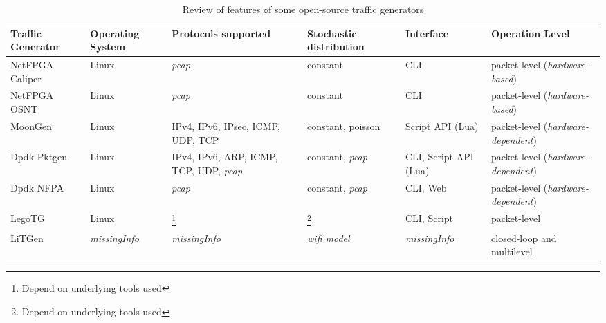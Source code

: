 \begin{table}[t!]
\caption{Review of features of some open-source traffic generators}
\begin{center}
\begin{footnotesize}
\begin{tabularx}{\linewidth}{
|>{\hsize=0.9\hsize\raggedright\arraybackslash}X	%
|>{\hsize=1.16\hsize\centering\arraybackslash}X					%
>{\hsize=1.37\hsize\centering\arraybackslash}X					%
>{\hsize=1.16\hsize\centering\arraybackslash}X					%
>{\hsize=0.7\hsize\centering\arraybackslash}X					%
>{\hsize=0.7\hsize\centering\arraybackslash}X|					%
}
	\hline
	\textbf{Traffic Generator} & 
    \textbf{Operating System} & 
    \textbf{Protocols supported} & 
    \textbf{Stochastic distribution} & 
    \textbf{Interface} & 
    \textbf{Operation Level} \\
 
    \hline
    NetFPGA Caliper &
    Linux &
    \textit{pcap} &
    constant &
    CLI &
    packet-level (\textit{hardware-based}) \\  

    \hline
    NetFPGA OSNT &
    Linux &
    \textit{pcap} &
    constant &
    CLI &
    packet-level (\textit{hardware-based}) \\    
 
     \hline
     MoonGen &
     Linux &
     IPv4, IPv6, IPsec, ICMP, UDP, TCP &
     constant, poisson &
     Script API (Lua) &
     packet-level (\textit{hardware-dependent}) \\ 
     
    \hline
    Dpdk Pktgen &
    Linux &
    IPv4, IPv6, ARP, ICMP, TCP, UDP, \textit{pcap} &
    constant, \textit{pcap} &
    CLI, Script API (Lua) &
    packet-level (\textit{hardware-dependent})\\      
     
     \hline
     Dpdk NFPA &
     Linux &
     \textit{pcap} &
     constant, \textit{pcap} &
     CLI, Web &
     packet-level (\textit{hardware-dependent}) \\ 
     
     \hline
     LegoTG &
     Linux &
     \footnote{Depend on underlying tools used} &
     \footnote{Depend on underlying tools used}  &
     CLI, Script &
     packet-level \\  
 
     \hline
     LiTGen &
     \textit{missingInfo} &
     \textit{missingInfo} &
     \textit{wifi model} &
     \textit{missingInfo} &
     closed-loop and multilevel\\   
 

\end{tabularx}
\end{footnotesize}
\end{center}
\end{table}
